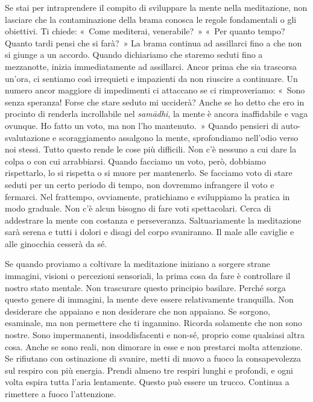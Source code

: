 Se stai per intraprendere il compito di sviluppare la mente nella
meditazione, non lasciare che la contaminazione della brama conosca le
regole fondamentali o gli obiettivi. Ti chiede: «~Come mediterai,
venerabile?~» «~Per quanto tempo? Quanto tardi pensi che si farà?~» La
brama continua ad assillarci fino a che non si giunge a un accordo.
Quando dichiariamo che staremo seduti fino a mezzanotte, inizia
immediatamente ad assillarci. Ancor prima che sia trascorsa un'ora, ci
sentiamo così irrequieti e impazienti da non riuscire a continuare. Un
numero ancor maggiore di impedimenti ci attaccano se ci rimproveriamo:
«~Sono senza speranza! Forse che stare seduto mi ucciderà? Anche se ho
detto che ero in procinto di renderla incrollabile nel \emph{samādhi},
la mente è ancora inaffidabile e vaga ovunque. Ho fatto un voto, ma non
l'ho mantenuto.~» Quando pensieri di auto-svalutazione e scoraggiamento
assalgono la mente, sprofondiamo nell'odio verso noi stessi. Tutto
questo rende le cose più difficili. Non c'è nessuno a cui dare la colpa
o con cui arrabbiarsi. Quando facciamo un voto, però, dobbiamo
rispettarlo, lo si rispetta o si muore per mantenerlo. Se facciamo voto
di stare seduti per un certo periodo di tempo, non dovremmo infrangere
il voto e fermarci. Nel frattempo, ovviamente, pratichiamo e sviluppiamo
la pratica in modo graduale. Non c'è alcun bisogno di fare voti
spettacolari. Cerca di addestrare la mente con costanza e perseveranza.
Saltuariamente la meditazione sarà serena e tutti i dolori e disagi del
corpo svaniranno. Il male alle caviglie e alle ginocchia cesserà da sé.

Se quando proviamo a coltivare la meditazione iniziano a sorgere strane
immagini, visioni o percezioni sensoriali, la prima cosa da fare è
controllare il nostro stato mentale. Non trascurare questo principio
basilare. Perché sorga questo genere di immagini, la mente deve essere
relativamente tranquilla. Non desiderare che appaiano e non desiderare
che non appaiano. Se sorgono, esaminale, ma non permettere che ti
ingannino. Ricorda solamente che non sono nostre. Sono impermanenti,
insoddisfacenti e non-sé, proprio come qualsiasi altra cosa. Anche se
sono reali, non dimorare in esse e non prestarci molta attenzione. Se
rifiutano con ostinazione di svanire, metti di nuovo a fuoco la
consapevolezza sul respiro con più energia. Prendi almeno tre respiri
lunghi e profondi, e ogni volta espira tutta l'aria lentamente. Questo
può essere un trucco. Continua a rimettere a fuoco l'attenzione.

